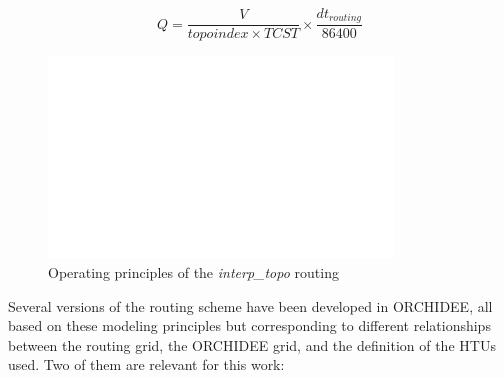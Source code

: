 \begin{equation}
    Q = \frac{V}{topoindex \times TCST} \times \frac{dt_{routing}}{86400}
\end{equation}

\begin{figure}[ht]
    \centering
    \includegraphics[width=1\linewidth]{images/routing_structure.png}
    \caption{Operating principles of the \textit{interp\_topo} routing}
    \label{fig:routing_principles}
\end{figure}

Several versions of the routing scheme have been developed in ORCHIDEE, all based on these modeling principles but corresponding to different relationships between the routing grid, the ORCHIDEE grid, and the definition of the HTUs used. Two of them are relevant for this work:

